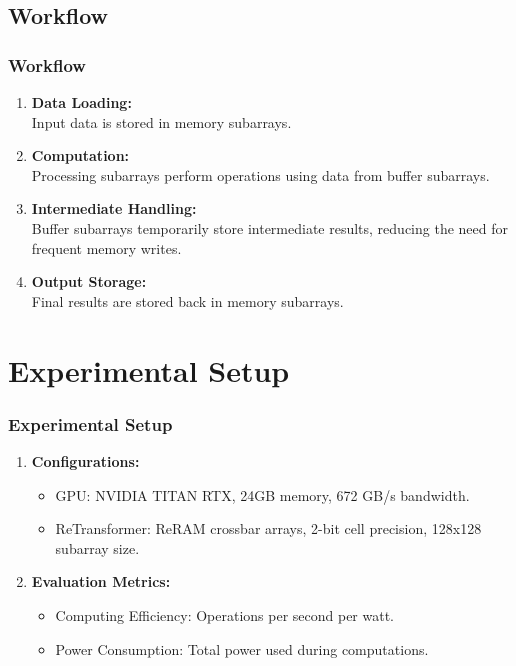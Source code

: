 \documentclass[
	12pt, %
]{beamer}
\begin{document}
\subsection{Workflow}
\begin{frame}
	\frametitle{Workflow}
	
	\begin{enumerate}
		\item 
		\textbf{Data Loading:}\\
		Input data is stored in memory subarrays.
		
		\item 
		\textbf{Computation:}\\
		Processing subarrays perform operations using data from buffer subarrays.
		
		\item 
		\textbf{Intermediate Handling:}\\
		Buffer subarrays temporarily store intermediate results, reducing the need for frequent memory writes.
		
		\item 
		\textbf{Output Storage:}\\
		Final results are stored back in memory subarrays.
	\end{enumerate}	
\end{frame}








\section{Experimental Setup}
\begin{frame}
	\frametitle{Experimental Setup}
	
	\begin{enumerate}
		\item 
		\textbf{Configurations:}\\
		\begin{itemize}
			\item GPU: NVIDIA TITAN RTX, 24GB memory, 672 GB/s bandwidth.
			\item ReTransformer: ReRAM crossbar arrays, 2-bit cell precision, 128x128 subarray size.
		\end{itemize}
		
		\item 
		\textbf{Evaluation Metrics:}\\
		\begin{itemize}
			\item Computing Efficiency: Operations per second per watt.
			\item Power Consumption: Total power used during computations.
		\end{itemize}
	\end{enumerate}	
\end{frame}
\end{document}
